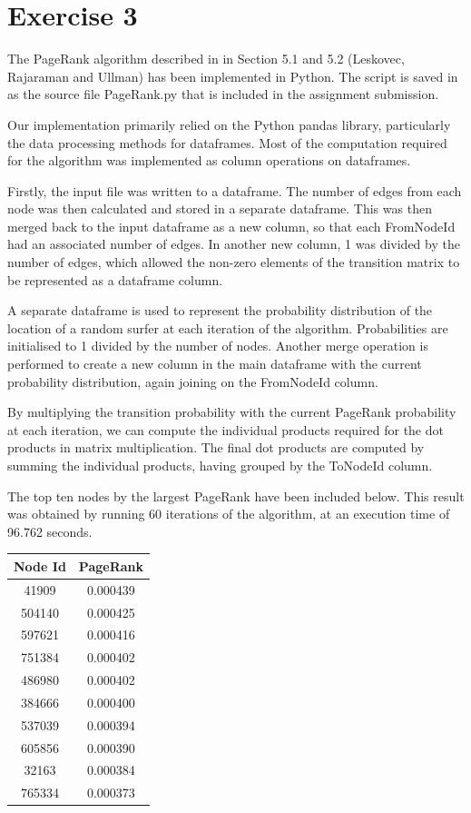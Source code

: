 \documentclass[12t]{article}
\begin{document}
	
	\section*{Exercise 3}
	
	The PageRank algorithm described in in Section 5.1 and 5.2
(Leskovec, Rajaraman and Ullman) has been implemented in Python. The script is saved in as the source file PageRank.py that is included in the assignment submission. 

	Our implementation primarily relied on the Python pandas library, particularly the data processing methods for dataframes. Most of the computation required for the algorithm was implemented as column operations on dataframes. 
	
	Firstly, the input file was written to a dataframe. The number of edges from each node was then calculated and stored in a separate dataframe. This was then merged back to the input dataframe as a new column, so that each FromNodeId had an associated number of edges. In another new column, 1 was divided by the number of edges, which allowed the non-zero elements of the transition matrix to be represented as a dataframe column. 
	
	A separate dataframe is used to represent the probability distribution of the location of a random surfer at each iteration of the algorithm. Probabilities are initialised to 1 divided by the number of nodes. Another merge operation is performed to create a new column in the main dataframe with the current probability distribution, again joining on the FromNodeId column. 
	
	By multiplying the transition probability with the current PageRank probability at each iteration, we can compute the individual products required for the dot products in matrix multiplication. The final dot products are computed by summing the individual products, having grouped by the ToNodeId column. 
	
	The top ten nodes by the largest PageRank have been included below. This result was obtained by running 60 iterations of the algorithm, at an execution time of 96.762 seconds. \\
	
	\begin{tabular}{cc}
	Node Id & PageRank \\
	\hline
  	41909 & 0.000439 \\
 	504140 & 0.000425 \\
 	597621 & 0.000416 \\
 	751384 & 0.000402 \\
 	486980 & 0.000402 \\
 	384666 & 0.000400 \\
 	537039 & 0.000394 \\
 	605856 & 0.000390 \\
  	32163 & 0.000384 \\
 	765334 & 0.000373 \\
	\hline 
	\end{tabular} \\\\
\end{document}
